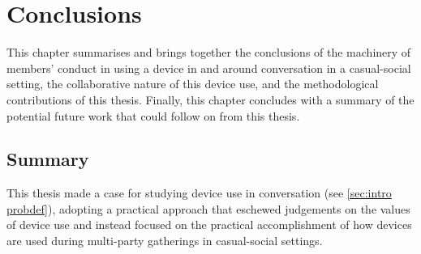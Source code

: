 



\chapter{Conclusions}\label{ch:synopsis conclusions}



\begin{revisedsubmission}
This chapter summarises and brings together the conclusions of the machinery of members' conduct in using a device in and around conversation in a casual-social setting, the collaborative nature of this device use, and the methodological contributions of this thesis.
Finally, this chapter concludes with a summary of the potential future work that could follow on from this thesis.
\end{revisedsubmission}






\section{Summary}\label{sec:synopsis conclusions summary}
This thesis made a case for studying device use in conversation (see \ref{sec:intro probdef}), adopting a practical approach that eschewed judgements on the values of device use and instead focused on the practical accomplishment of how devices are used during multi-party gatherings in casual-social settings.

